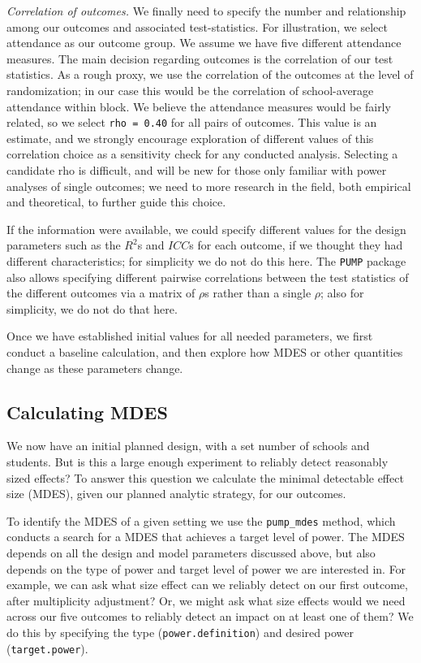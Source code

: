 \documentclass[
]{article}
\begin{document}
\emph{Correlation of outcomes.} We finally need to specify the number
and relationship among our outcomes and associated test-statistics. For
illustration, we select attendance as our outcome group. We assume we
have five different attendance measures. The main decision regarding
outcomes is the correlation of our test statistics. As a rough proxy, we
use the correlation of the outcomes at the level of randomization; in
our case this would be the correlation of school-average attendance
within block. We believe the attendance measures would be fairly
related, so we select \texttt{rho\ =\ 0.40} for all pairs of outcomes.
This value is an estimate, and we strongly encourage exploration of
different values of this correlation choice as a sensitivity check for
any conducted analysis. Selecting a candidate rho is difficult, and will
be new for those only familiar with power analyses of single outcomes;
we need to more research in the field, both empirical and theoretical,
to further guide this choice.

If the information were available, we could specify different values for
the design parameters such as the \(R^2\)s and \(ICC\)s for each
outcome, if we thought they had different characteristics; for
simplicity we do not do this here. The \texttt{PUMP} package also allows
specifying different pairwise correlations between the test statistics
of the different outcomes via a matrix of \(\rho\)s rather than a single
\(\rho\); also for simplicity, we do not do that here.

Once we have established initial values for all needed parameters, we
first conduct a baseline calculation, and then explore how MDES or other
quantities change as these parameters change.

\subsection{Calculating MDES}

We now have an initial planned design, with a set number of schools and
students. But is this a large enough experiment to reliably detect
reasonably sized effects? To answer this question we calculate the
minimal detectable effect size (MDES), given our planned analytic
strategy, for our outcomes.

To identify the MDES of a given setting we use the \texttt{pump\_mdes}
method, which conducts a search for a MDES that achieves a target level
of power. The MDES depends on all the design and model parameters
discussed above, but also depends on the type of power and target level
of power we are interested in. For example, we can ask what size effect
can we reliably detect on our first outcome, after multiplicity
adjustment? Or, we might ask what size effects would we need across our
five outcomes to reliably detect an impact on at least one of them? We
do this by specifying the type (\texttt{power.definition}) and desired
power (\texttt{target.power}).
\end{document}
